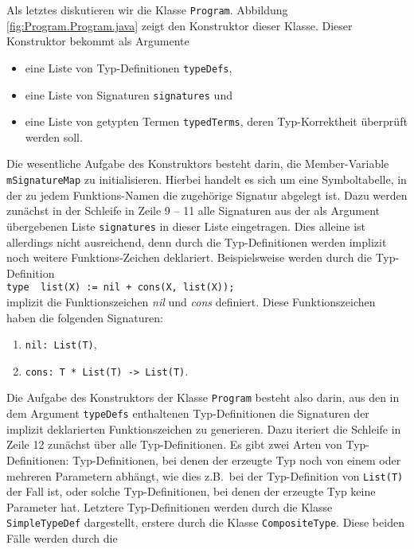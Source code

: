 \noindent
Als letztes diskutieren wir die Klasse \texttt{Program}.  Abbildung \ref{fig:Program.Program.java}
zeigt den Konstruktor dieser Klasse.  Dieser Konstruktor bekommt als Argumente 
\begin{itemize}
\item eine Liste von Typ-Definitionen \texttt{typeDefs},
\item eine Liste von Signaturen \texttt{signatures} und
\item eine Liste von getypten Termen \texttt{typedTerms}, deren Typ-Korrektheit
      \"uberpr\"uft werden soll.
\end{itemize}
Die wesentliche Aufgabe des Konstruktors besteht darin,  die Member-Variable
\texttt{mSignatureMap} zu initialisieren.  Hierbei handelt es sich um eine Symboltabelle,
in der zu jedem Funktions-Namen die zugeh\"orige Signatur abgelegt ist.
Dazu werden zun\"achst in der Schleife in Zeile 9 -- 11 alle
Signaturen aus der als Argument \"ubergebenen Liste \texttt{signatures} in dieser Liste eingetragen.
Dies alleine ist allerdings nicht ausreichend, denn durch die Typ-Definitionen werden implizit noch
weitere Funktions-Zeichen deklariert.  Beispielsweise werden durch die Typ-Definition
\\[0.2cm]
\hspace*{1.3cm}
\texttt{type \ list(X) := nil + cons(X, list(X));}
\\[0.2cm]
implizit die Funktionszeichen \textsl{nil} und \textsl{cons} definiert.  Diese Funktionszeichen
haben die folgenden Signaturen:
\begin{enumerate}
\item \texttt{nil: List(T)},
\item \texttt{cons: T * List(T) -> List(T)}.
\end{enumerate}
Die Aufgabe des Konstruktors der Klasse \texttt{Program} besteht also darin, aus den in dem Argument
\texttt{typeDefs} enthaltenen Typ-Definitionen die Signaturen der implizit deklarierten
Funktionszeichen zu generieren.  Dazu iteriert die Schleife in Zeile 12 zun\"achst \"uber alle
Typ-Definitionen.   Es gibt zwei Arten von Typ-Definitionen:  Typ-Definitionen, bei denen der
erzeugte Typ noch von einem oder mehreren Parametern abh\"angt, wie dies z.B.~bei der Typ-Definition
von \texttt{List(T)} der Fall ist, oder solche Typ-Definitionen, bei denen der erzeugte Typ keine
Parameter hat.  Letztere Typ-Definitionen werden durch die Klasse \texttt{SimpleTypeDef}
dargestellt, erstere durch die Klasse \texttt{CompositeType}.  Diese beiden F\"alle werden durch die
